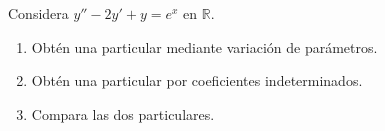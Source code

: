 Considera \(y''-2y'+y=e^x\) en \(\mathbb R\).

\begin{enumerate}[label=(\alph*),ref=\alph*,leftmargin=*]
\item Obtén una particular mediante variación de parámetros.
\item Obtén una particular por coeficientes indeterminados.
\item Compara las dos particulares.
\end{enumerate}
